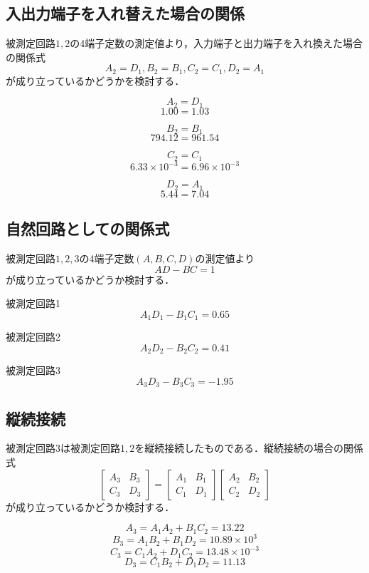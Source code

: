 \newpage

\subsection{入出力端子を入れ替えた場合の関係}
被測定回路$1,2$の4端子定数の測定値より，入力端子と出力端子を入れ換えた場合の関係式
$$
A_2=D_1, B_2=B_1, C_2=C_1, D_2=A_1
$$
が成り立っているかどうかを検討する．

$$A_2=D_1$$
$$1.00=1.03$$

$$B_2=B_1$$
$$794.12=961.54$$

$$C_2=C_1$$
$$6.33\times10^{-3}=6.96\times10^{-3}$$

$$D_2=A_1$$
$$5.44=7.04$$

\subsection{自然回路としての関係式}
被測定回路$1,2,3$の4端子定数$(A, B, C, D)$の測定値より
$$
A D-B C=1
$$
が成り立っているかどうか検討する． 

\begin{description}
    \item 被測定回路1
    $$
    A_1D_1-B_1C_1=0.65
    $$
    
    \item 被測定回路2
    $$
    A_2D_2-B_2C_2=0.41
    $$
    
    \item 被測定回路3
    $$
    A_3D_3-B_3C_3=-1.95
    $$
    
\end{description}

\subsection{縦続接続}
被測定回路3は被測定回路$1,2$を縦続接続したものである．縦続接続の場合の関係式
$$
\left[\begin{array}{ll}
A_3 & B_3 \\
C_3 & D_3
\end{array}\right]=\left[\begin{array}{ll}
A_1 & B_1 \\
C_1 & D_1
\end{array}\right]\left[\begin{array}{cc}
A_2 & B_2 \\
C_2 & D_2
\end{array}\right]
$$
が成り立っているかどうか検討する．

$$
A_3=A_1A_2+B_1C_2=13.22
$$
$$
B_3=A_1B_2+B_1D_2=10.89\times10^3
$$
$$
C_3=C_1A_2+D_1C_2=13.48\times10^{-3}
$$
$$
D_3=C_1B_2+D_1D_2=11.13
$$
